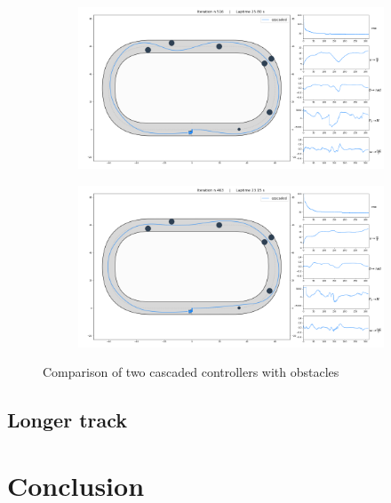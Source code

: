 \documentclass[a4paper, onecolumn, 12pt]{article}
\begin{document}
\begin{figure}[H]
    \centering
    \begin{subfigure}{\textwidth}
        \centering
        \includegraphics[width=\textwidth]{assets/obstacles1_ippodromo.png}
    \end{subfigure}
    \begin{subfigure}{\textwidth}
        \centering
        \includegraphics[width=\textwidth]{assets/obstacle2_ippodromo.png}
    \end{subfigure}
    \caption[short]{Comparison of two cascaded controllers with obstacles}
\end{figure}




\subsection{Longer track}



\newpage
\section{Conclusion}
\end{document}
